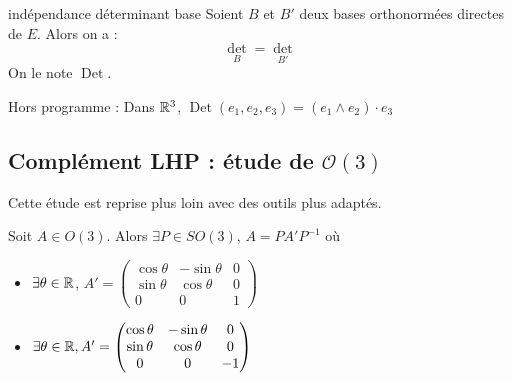\begin{proposition}{indépendance déterminant base}{}
    Soient $B$ et $B'$ deux bases orthonormées directes de $E$. Alors on a : 
    $$\det_B = \det_{B'}$$
    On le note $\operatorname{Det}$. 
\end{proposition}

\begin{remarque}
    Hors programme : Dans $\mathbb{R}^3$, $\operatorname{Det} (e_1, e_2, e_3) = (e_1 \wedge e_2) \cdot e_3$
\end{remarque}

\subsection{Complément LHP : étude de \texorpdfstring{$\mathcal O(3)$}{O(3)}}

Cette étude est reprise plus loin avec des outils plus adaptés. 

Soit $A \in O(3)$. Alors $\exists P \in SO(3)$, $A = PA'P^{-1}$ où 

\begin{itemize}
    \item $\exists \theta \in \mathbb{R}$, $A' = \begin{pmatrix}
        \cos \theta & -\sin \theta & 0 \\
        \sin \theta & \cos \theta & 0 \\
        0 & 0 & 1
    \end{pmatrix}$
    \item $\exists \theta \in \mathbb{R}, A' = \begin{pmatrix}
        \cos \theta & -\sin \theta & 0 \\
        \sin \theta & \cos \theta & 0 \\
        0 & 0 & -1
    \end{pmatrix}$
\end{itemize}

